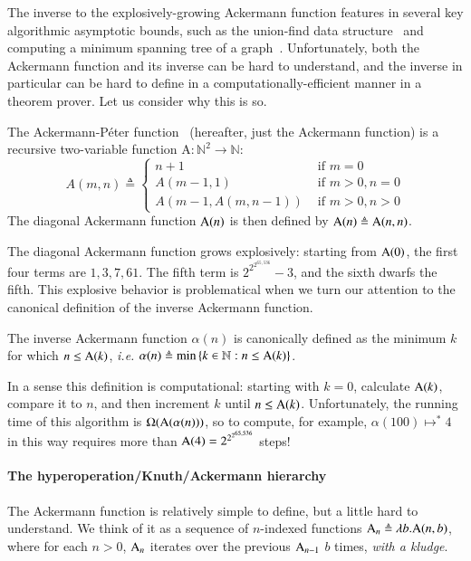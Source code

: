 The inverse to the
explosively-growing Ackermann function features in several key algorithmic asymptotic
bounds, such as the union-find data structure~\cite{tarjan} and computing a minimum spanning 
tree of a graph~\cite{chazelle}.  Unfortunately, both the Ackermann function and its inverse 
can be hard to understand, and the inverse in particular can be hard to define in a computationally-efficient manner in a theorem prover.  Let us consider why this
is so.
\begin{defn} \label{defn: ack}
The Ackermann-P\'eter function~\cite{blah} (hereafter, just the Ackermann function) is a recursive two-variable
function $\text{A} : \mathbb{N}^2 \to \mathbb{N}$:
\begin{equation}
A(m, n) \triangleq \begin{cases}
n + 1 & \text{ if } m = 0 \\
A(m-1, 1) & \text{ if } m > 0, n = 0 \\
A(m-1, A(m, n-1)) & \text{ if } m > 0, n > 0
\end{cases}
\end{equation}
The diagonal Ackermann function $\text{A}(n)$ is then defined by $\text{A}(n) \triangleq \text{A}(n, n)$.
\end{defn}
The diagonal Ackermann function grows explosively: starting from $\text{A}(0)$, the first four terms are $1, 3, 7, 61$.  The fifth term is $2^{2^{2^{65,536}}} - 3$, and the sixth dwarfs the fifth.
This explosive behavior is problematical when we turn our attention to the canonical definition of 
the inverse Ackermann function\cite{blah}.
\begin{defn} \label{defn: inv_ack}
The inverse Ackermann function $\alpha(n)$ is canonically defined as the minimum $k$ for which $n \le \text{A}(k)$, \emph{i.e.} $\alpha(n) \triangleq \min\left\{k\in \mathbb{N} : n \le \text{A}(k)\right\}$.
\end{defn}
In a sense this definition is computational: starting with $k=0$, calculate $\text{A}(k)$, compare
it to $n$, and then increment $k$ until $n \le \text{A}(k)$.  Unfortunately, the running time of this algorithm is $\Omega(\text{A}(\alpha(n)))$, so to compute, for example, $\alpha(100) \mapsto^{*} 4$ in this way requires more than $\text{A}(4) = 2^{2^{2^{65,536}}}$ steps!

\paragraph{The hyperoperation/Knuth/Ackermann hierarchy}

The Ackermann function is relatively simple to define, but a little hard to understand.  We 
think of it as a sequence of $n$-indexed functions $\text{A}_n \triangleq \lambda b.\text{A}(n,b)$, where for each $n>0$, $\text{A}_n$ iterates over the previous $\text{A}_{n-1}$ $b$ times,
\emph{with a kludge}.

